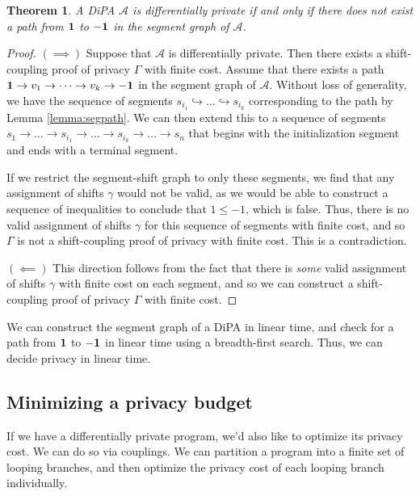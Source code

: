 \documentclass[12pt]{article}
\newtheorem{thm}{Theorem}[section]
\theoremstyle{definition}
\begin{document}
\begin{thm}
    \label{theorem:decide_privacy}
    A DiPA $\mathcal{A}$ is differentially private if and only if there does not exist a path from $\bf 1$ to $\bf -1$ in the segment graph of $\mathcal{A}$.
\end{thm}

\begin{proof}
    $(\implies)$ Suppose that $\mathcal{A}$ is differentially private. Then there exists a shift-coupling proof of privacy $\Gamma$ with finite cost. Assume that there exists a path ${\bf 1} \to v_1 \to \dots \to v_k \to {\bf -1}$ in the segment graph of $\mathcal{A}$. 
    Without loss of generality, we have the sequence of segments $s_{i_1} \hookrightarrow \dots \hookrightarrow s_{i_k}$ corresponding to the path by Lemma \ref{lemma:segpath}. We can then extend this to a sequence of segments $s_1 \to \dots \to s_{i_1} \to \dots \to s_{i_k} \to \dots \to s_n$ that begins with the initialization segment and ends with a terminal segment. 

    If we restrict the segment-shift graph to only these segments, we find that any assignment of shifts $\gamma$ would not be valid, as we would be able to construct a sequence of inequalities to conclude that $1 \leq -1$, which is false. Thus, there is no valid assignment of shifts $\gamma$ for this sequence of segments with finite cost, and so $\Gamma$ is not a shift-coupling proof of privacy with finite cost. This is a contradiction.

    $(\impliedby)$ This direction follows from the fact that there is \textit{some} valid assignment of shifts $\gamma$ with finite cost on each segment, and so we can construct a shift-coupling proof of privacy $\Gamma$ with finite cost.
\end{proof}

We can construct the segment graph of a DiPA in linear time, and check for a path from $\bf 1$ to $\bf -1$ in linear time using a breadth-first search. Thus, we can decide privacy in linear time.

\subsection{Minimizing a privacy budget}

If we have a differentially private program, we'd also like to optimize its privacy cost. We can do so via couplings. We can partition a program into a finite set of looping branches, and then optimize the privacy cost of each looping branch individually.
\end{document}
